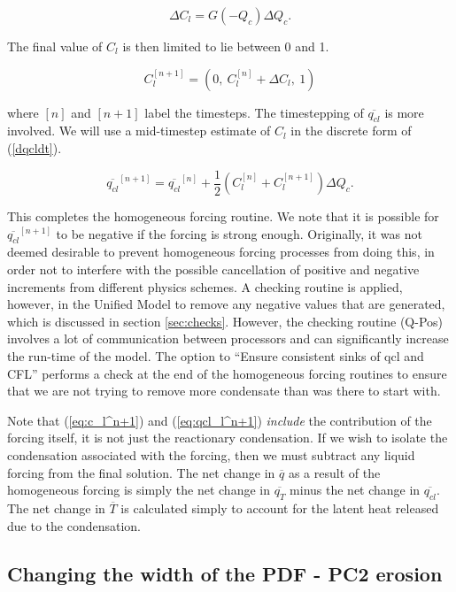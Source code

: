 \documentclass{UMDP_article}
\begin{document}
\begin{equation}
\Delta{C_l} = G(-Q_c) \Delta{Q_c} .
\label{eq:deltac}
\end{equation}

The final value of $C_l$ is then limited to lie between 0 and 1.

\begin{equation}
C_l^{[n+1]} = (0, ~ C_l^{[n]} + \Delta{C_l}, ~ 1)
\label{eq:c_l^n+1}
\end{equation}

where $[n]$ and $[n+1]$ label the timesteps.
The timestepping of $\overline{q_{cl}}$ is more involved. We will use a
mid-timestep estimate of $C_l$ in the discrete form of (\ref{dqcldt}).

\begin{equation}
\overline{q_{cl}}^{[n+1]} = \overline{q_{cl}}^{[n]} + \frac{1}{2}
(C_l^{[n]} + C_l^{[n+1]}) \Delta{Q_c}.
\label{eq:qcl_l^n+1}
\end{equation}

This completes the homogeneous forcing routine. We note that it is possible
for $\overline{q_{cl}}^{[n+1]}$ to be negative if the forcing is strong enough.
Originally, it was not deemed desirable to prevent 
homogeneous forcing processes from doing this, in order  
not to interfere with the possible cancellation of positive and 
negative increments from different physics schemes. A checking routine
is applied, however, in the Unified Model to remove any negative values that are
generated, which is discussed in section \ref{sec:checks}.
However, the checking routine (Q-Pos) involves a lot of communication between processors and can significantly 
increase the run-time of the model. The option to ``Ensure consistent sinks of qcl and CFL'' 
performs a check at the end of the homogeneous forcing routines to ensure that we are not trying to remove 
more condensate than was there to start with. 

Note that (\ref{eq:c_l^n+1}) and (\ref{eq:qcl_l^n+1})
\textit{include} the contribution
of the forcing itself, it is not just the reactionary condensation. If
we wish to isolate the condensation associated with the forcing, then
we must subtract any liquid forcing from the final solution. The
net change in $\overline{q}$ as a result of the homogeneous forcing is
simply the net change in $\overline{q_T}$ minus the net
change in $\overline{q_{cl}}$. The net change in $\overline{T}$ is
calculated simply to account for the latent heat released due to the
condensation.

\subsection{Changing the width of the PDF - PC2 erosion}
\label{sec:width}
\end{document}
